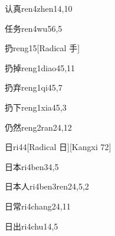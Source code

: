 \begin{verbete}{认真}{ren4zhen1}{4,10}
\end{verbete}

\begin{verbete}{任务}{ren4wu5}{6,5}
\end{verbete}

\begin{verbete}{扔}{reng1}{5}[Radical 手]
\end{verbete}

\begin{verbete}{扔掉}{reng1diao4}{5,11}
\end{verbete}

\begin{verbete}{扔弃}{reng1qi4}{5,7}
\end{verbete}

\begin{verbete}{扔下}{reng1xia4}{5,3}
\end{verbete}

\begin{verbete}{仍然}{reng2ran2}{4,12}
\end{verbete}

\begin{verbete}{日}{ri4}{4}[Radical 日][Kangxi 72]
\end{verbete}

\begin{verbete}{日本}{ri4ben3}{4,5}
\end{verbete}

\begin{verbete}{日本人}{ri4ben3ren2}{4,5,2}
\end{verbete}

\begin{verbete}{日常}{ri4chang2}{4,11}
\end{verbete}

\begin{verbete}{日出}{ri4chu1}{4,5}
\end{verbete}

